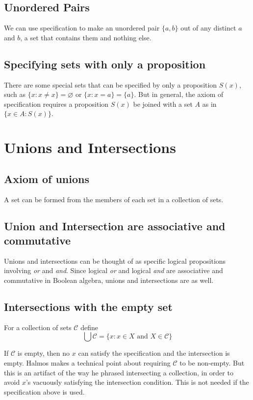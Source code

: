 \documentclass{article}
\begin{document}
\subsection{Unordered Pairs} We can use specification to make an unordered pair $\{a, b\}$ out of any distinct $a$ and $b$, a set that contains them and nothing else. 

\subsection{Specifying sets with only a proposition} There are some special sets that can be specified by only a proposition $S(x)$, such as $\{x: x \neq x\} = \varnothing$ or $\{x: x = a\} = \{a\}$. But in general, the axiom of specification requires a proposition $S(x)$ be joined with a set $A$ as in $\{x \in A: S(x)\}$.

\section{Unions and Intersections}

\subsection{Axiom of unions} A set can be formed from the members of each set in a collection of sets.

\subsection{Union and Intersection are associative and commutative} Unions and intersections can be thought of as specific logical propositions involving \textit{or} and \textit{and}. Since logical \textit{or} and logical \textit{and} are associative and commutative in Boolean algebra, unions and intersections are as well.

\subsection{Intersections with the empty set} For a collection of sets $\mathcal{C}$ define 
$$\bigcup \mathcal{C} = \{x: x \in X \text{ and } X \in \mathcal{C}\}$$

If $\mathcal{C}$ is empty, then no $x$ can satisfy the specification and the intersection is empty. Halmos makes a technical point about requiring $\mathcal{C}$ to be non-empty. But this is an artifact of the way he phrased intersecting a collection, in order to avoid $x$'s vacuously satisfying the intersection condition. This is not needed if the specification above is used.
\end{document}
